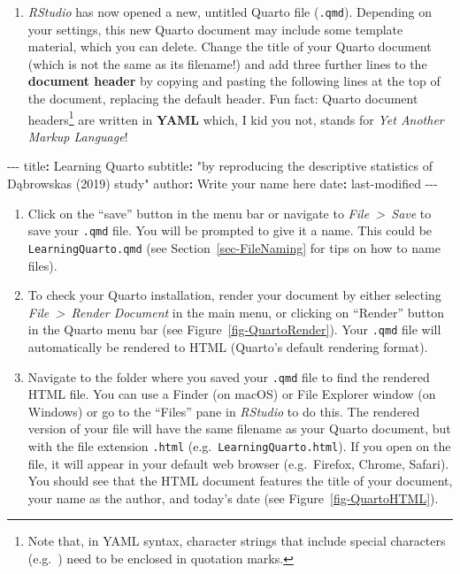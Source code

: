 \documentclass[
  letterpaper,
  DIV=11,
  numbers=noendperiod]{scrreprt}
\newenvironment{Shaded}{\begin{snugshade}}{\end{snugshade}}
\newcommand{\AttributeTok}[1]{\textcolor[rgb]{0.40,0.45,0.13}{#1}}
\newcommand{\FunctionTok}[1]{\textcolor[rgb]{0.28,0.35,0.67}{#1}}
\newcommand{\KeywordTok}[1]{\textcolor[rgb]{0.00,0.23,0.31}{\textbf{#1}}}
\newcommand{\PreprocessorTok}[1]{\textcolor[rgb]{0.68,0.00,0.00}{#1}}
\newcommand{\StringTok}[1]{\textcolor[rgb]{0.13,0.47,0.30}{#1}}
\providecommand{\tightlist}{%
  \setlength{\itemsep}{0pt}\setlength{\parskip}{0pt}}
\begin{document}
\begin{enumerate}
\def\labelenumi{\arabic{enumi}.}
\setcounter{enumi}{2}
\tightlist
\item
  \emph{RStudio} has now opened a new, untitled Quarto file
  (\texttt{.qmd}). Depending on your settings, this new Quarto document
  may include some template material, which you can delete. Change the
  title of your Quarto document (which is not the same as its filename!)
  and add three further lines to the \textbf{document header} by copying
  and pasting the following lines at the top of the document, replacing
  the default header. Fun fact: Quarto document headers\footnote{Note
    that, in YAML syntax, character strings that include special
    characters (e.g.~\texttt{\textquotesingle{}}) need to be enclosed in
    quotation marks.} are written in \textbf{YAML} which, I kid you not,
  stands for \emph{Yet Another Markup Language}!~
\end{enumerate}

\begin{Shaded}
\begin{Highlighting}[]
\PreprocessorTok{{-}{-}{-}}
\FunctionTok{title}\KeywordTok{:}\AttributeTok{ Learning Quarto}
\FunctionTok{subtitle}\KeywordTok{:}\AttributeTok{ }\StringTok{"by reproducing the descriptive statistics of Dąbrowska\textquotesingle{}s (2019) study"}
\FunctionTok{author}\KeywordTok{:}\AttributeTok{ Write your name here}
\FunctionTok{date}\KeywordTok{:}\AttributeTok{ last{-}modified}
\PreprocessorTok{{-}{-}{-}}
\end{Highlighting}
\end{Shaded}

\begin{enumerate}
\def\labelenumi{\arabic{enumi}.}
\setcounter{enumi}{3}
\item
  Click on the ``save'' button in the menu bar or navigate to
  \emph{File~\textgreater~Save} to save your \texttt{.qmd} file. You
  will be prompted to give it a name. This could be
  \texttt{LearningQuarto.qmd} (see Section~\ref{sec-FileNaming} for tips
  on how to name files).
\item
  To check your Quarto installation, render your document by either
  selecting \emph{File~\textgreater~Render Document} in the main menu,
  or clicking on ``Render'' button in the Quarto menu bar (see
  Figure~\ref{fig-QuartoRender}). Your \texttt{.qmd} file will
  automatically be rendered to HTML (Quarto's default rendering format).
\item
  Navigate to the folder where you saved your \texttt{.qmd} file to find
  the rendered HTML file. You can use a Finder (on macOS) or File
  Explorer window (on Windows) or go to the ``Files'' pane in
  \emph{RStudio} to do this. The rendered version of your file will have
  the same filename as your Quarto document, but with the file extension
  \texttt{.html} (e.g.~\texttt{LearningQuarto.html}). If you open on the
  file, it will appear in your default web browser (e.g.~Firefox,
  Chrome, Safari). You should see that the HTML document features the
  title of your document, your name as the author, and today's date (see
  Figure~\ref{fig-QuartoHTML}).
\end{enumerate}
\end{document}
